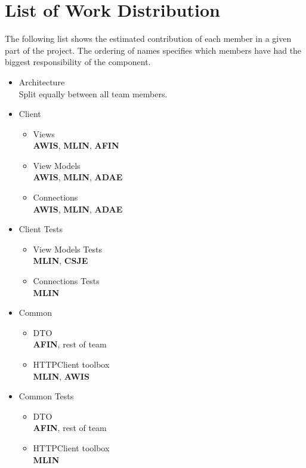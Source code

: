 \appendix
\newpage


\section{List of Work Distribution \label{sec:ListOfWorkDistribution}}
The following list shows the estimated contribution of each member in a given part of the project. The ordering of names specifies which members have had the biggest responsibility of the component.

\begin{itemize}
	\item Architecture\\
	Split equally between all team members.
	\item Client
	\begin{itemize}
		\item Views\\
		\textbf{AWIS}, \textbf{MLIN}, \textbf{AFIN}
		\item View Models\\
		\textbf{AWIS}, \textbf{MLIN}, \textbf{ADAE}
		\item Connections\\
		\textbf{AWIS}, \textbf{MLIN}, \textbf{ADAE}
	\end{itemize}
	\item Client Tests
	\begin{itemize}
		\item View Models Tests\\
		\textbf{MLIN}, \textbf{CSJE}
		\item Connections Tests\\
		\textbf{MLIN}
	\end{itemize}
	\item Common
	\begin{itemize}
		\item DTO\\
		\textbf{AFIN}, rest of team
		\item HTTPClient toolbox\\
		\textbf{MLIN}, \textbf{AWIS}
	\end{itemize}
	\item Common Tests
	\begin{itemize}
		\item DTO\\
		\textbf{AFIN}, rest of team
		\item HTTPClient toolbox\\
		\textbf{MLIN}
	\end{itemize}

\end{itemize}
